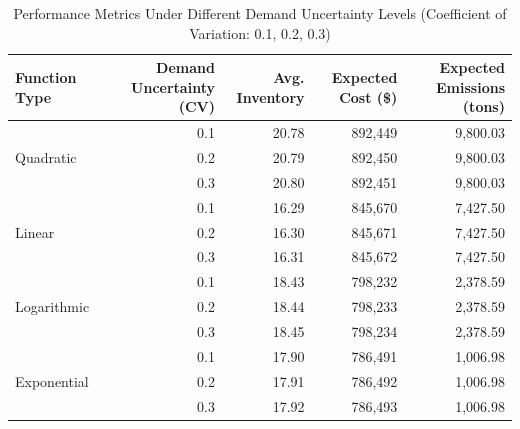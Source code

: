 \begin{table}[htbp]
\begin{table}[t!]
    \centering
    \caption{Performance Metrics Under Different Demand Uncertainty Levels (Coefficient of Variation: 0.1, 0.2, 0.3)}
    \label{tab:uncertainty}
    \begin{tabular}{lrrrr}
        \toprule
        Function Type & Demand Uncertainty (CV) & Avg. Inventory & Expected Cost (\$) & Expected Emissions (tons) \\
        \midrule
        \multirow{3}{*}{Quadratic} & 0.1 & 20.78 & 892,449 & 9,800.03 \\
        & 0.2 & 20.79 & 892,450 & 9,800.03 \\
        & 0.3 & 20.80 & 892,451 & 9,800.03 \\
        \midrule
        \multirow{3}{*}{Linear} & 0.1 & 16.29 & 845,670 & 7,427.50 \\
        & 0.2 & 16.30 & 845,671 & 7,427.50 \\
        & 0.3 & 16.31 & 845,672 & 7,427.50 \\
        \midrule
        \multirow{3}{*}{Logarithmic} & 0.1 & 18.43 & 798,232 & 2,378.59 \\
        & 0.2 & 18.44 & 798,233 & 2,378.59 \\
        & 0.3 & 18.45 & 798,234 & 2,378.59 \\
        \midrule
        \multirow{3}{*}{Exponential} & 0.1 & 17.90 & 786,491 & 1,006.98 \\
        & 0.2 & 17.91 & 786,492 & 1,006.98 \\
        & 0.3 & 17.92 & 786,493 & 1,006.98 \\
        \bottomrule
    \end{tabular}
\end{table}




\end{table}
